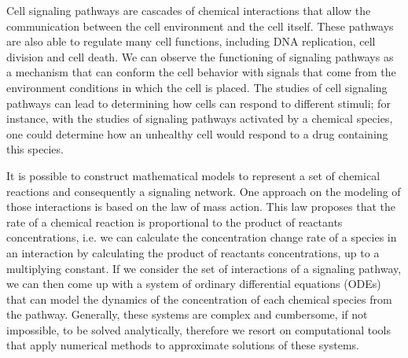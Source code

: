 




Cell signaling pathways are cascades of chemical interactions that 
allow the communication between the cell environment and the 
cell itself. These pathways are also able to regulate many cell 
functions, including DNA replication, cell division and cell death. We
can observe the functioning of signaling pathways as a mechanism that 
can conform the cell behavior with signals that come from the 
environment conditions in which the cell is placed. The studies of cell 
signaling pathways can lead to determining how cells can respond to 
different stimuli; for instance, with the studies of signaling pathways
activated by a chemical species, one could determine how an unhealthy 
cell would respond to a drug containing this species.

It is possible to construct mathematical models to represent a set of
chemical reactions and consequently a signaling network. One approach on 
the modeling of those interactions is based on the law of mass action. 
This law proposes that the rate of a chemical reaction is proportional 
to the product of reactants concentrations, i.e. we can calculate the 
concentration change rate of a species in an interaction by calculating 
the product of reactants concentrations, up to a multiplying constant. 
If we consider the set of interactions of a signaling pathway, we can
then come up with a system of ordinary differential equations (ODEs) 
that can model the dynamics of the concentration of each chemical 
species from the pathway. Generally, these systems are complex and 
cumbersome, if not impossible, to be solved analytically, therefore we 
resort on computational tools that apply numerical methods to 
approximate solutions of these systems.

